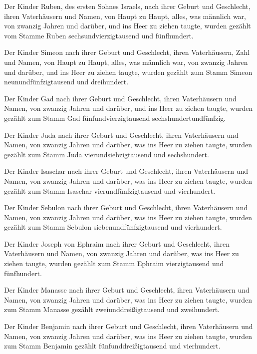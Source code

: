  Der Kinder Ruben, des ersten Sohnes Israels, nach ihrer
Geburt und Geschlecht, ihren Vaterhäusern und Namen, von Haupt zu Haupt,
alles, was männlich war, von zwanzig Jahren und darüber, und ins Heer zu
ziehen taugte,  wurden gezählt vom Stamme Ruben
sechsundvierzigtausend und fünfhundert.

 Der Kinder Simeon nach ihrer Geburt und Geschlecht, ihren
Vaterhäusern, Zahl und Namen, von Haupt zu Haupt, alles, was männlich
war, von zwanzig Jahren und darüber, und ins Heer zu ziehen taugte,
 wurden gezählt zum Stamm Simeon neunundfünfzigtausend und
dreihundert.

 Der Kinder Gad nach ihrer Geburt und Geschlecht, ihren
Vaterhäusern und Namen, von zwanzig Jahren und darüber, und ins Heer zu
ziehen taugte,  wurden gezählt zum Stamm Gad
fünfundvierzigtausend sechshundertundfünfzig.

 Der Kinder Juda nach ihrer Geburt und Geschlecht, ihren
Vaterhäusern und Namen, von zwanzig Jahren und darüber, was ins Heer zu
ziehen taugte,  wurden gezählt zum Stamm Juda
vierundsiebzigtausend und sechshundert.

 Der Kinder Isaschar nach ihrer Geburt und Geschlecht,
ihren Vaterhäusern und Namen, von zwanzig Jahren und darüber, was ins
Heer zu ziehen taugte,  wurden gezählt zum Stamm Isaschar
vierundfünfzigtausend und vierhundert.

 Der Kinder Sebulon nach ihrer Geburt und Geschlecht, ihren
Vaterhäusern und Namen, von zwanzig Jahren und darüber, was ins Heer zu
ziehen taugte,  wurden gezählt zum Stamm Sebulon
siebenundfünfzigtausend und vierhundert.

 Der Kinder Joseph von Ephraim nach ihrer Geburt und
Geschlecht, ihren Vaterhäusern und Namen, von zwanzig Jahren und
darüber, was ins Heer zu ziehen taugte,  wurden gezählt zum
Stamm Ephraim vierzigtausend und fünfhundert.

 Der Kinder Manasse nach ihrer Geburt und Geschlecht, ihren
Vaterhäusern und Namen, von zwanzig Jahren und darüber, was ins Heer zu
ziehen taugte,  wurden zum Stamm Manasse gezählt
zweiunddreißigtausend und zweihundert.

 Der Kinder Benjamin nach ihrer Geburt und Geschlecht,
ihren Vaterhäusern und Namen, von zwanzig Jahren und darüber, was ins
Heer zu ziehen taugte,  wurden zum Stamm Benjamin gezählt
fünfunddreißigtausend und vierhundert.

